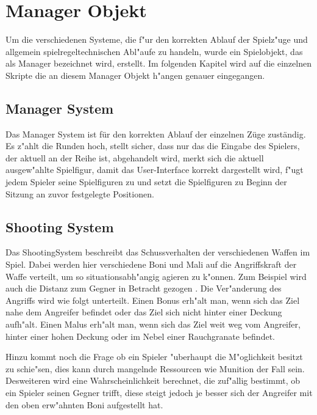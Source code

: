 \chapter{Manager Objekt}

Um die verschiedenen Systeme, die f"ur den korrekten Ablauf der Spielz"uge und allgemein spielregeltechnischen Abl"aufe zu handeln, wurde ein Spielobjekt, das als Manager bezeichnet wird, erstellt. Im folgenden Kapitel wird auf die einzelnen Skripte die an diesem Manager Objekt h"angen genauer eingegangen. 

\section{Manager System}

Das Manager System ist für den korrekten Ablauf der einzelnen Züge zuständig. Es z"ahlt die Runden hoch, stellt sicher, dass nur das die Eingabe des Spielers, der aktuell an der Reihe ist, abgehandelt wird, merkt sich die aktuell ausgew"ahlte Spielfigur, damit das User-Interface korrekt dargestellt wird, f"ugt jedem Spieler seine Spielfiguren zu und setzt die Spielfiguren zu Beginn der Sitzung an zuvor festgelegte Positionen.

\section{Shooting System}

Das ShootingSystem beschreibt das Schussverhalten der verschiedenen Waffen im Spiel. Dabei werden hier verschiedene Boni und Mali auf die Angriffskraft der Waffe verteilt, um so situationsabh"angig agieren zu k"onnen. Zum Beispiel wird auch die Distanz zum Gegner in Betracht gezogen . Die Ver"anderung des Angriffs wird wie folgt unterteilt. \newline
Einen Bonus erh"alt man, wenn sich das Ziel nahe dem Angreifer befindet oder das Ziel sich nicht hinter einer Deckung aufh"alt. \newline
Einen Malus erh"alt man, wenn sich das Ziel weit weg vom Angreifer, hinter einer hohen Deckung oder im Nebel einer Rauchgranate befindet.\newline

Hinzu kommt noch die Frage ob ein Spieler "uberhaupt die M"oglichkeit besitzt zu schie"sen, dies kann durch mangelnde Ressourcen wie Munition der Fall sein.
Desweiteren wird eine Wahrscheinlichkeit berechnet, die zuf"allig bestimmt, ob ein Spieler seinen Gegner trifft, diese steigt jedoch je besser sich der Angreifer mit den oben erw"ahnten Boni aufgestellt hat.


